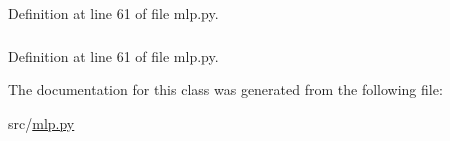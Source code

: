 Definition at line 61 of file mlp.py.

\hypertarget{classmlp_1_1mlp_a07b85e2f033556b9ef42dbc9b05011c6}{
\subsubsection[{writeweights}]{}}
\label{classmlp_1_1mlp_a07b85e2f033556b9ef42dbc9b05011c6}


Definition at line 61 of file mlp.py.



The documentation for this class was generated from the following file:\begin{DoxyCompactItemize}
\item 
src/\hyperlink{mlp_8py}{mlp.py}\end{DoxyCompactItemize}
